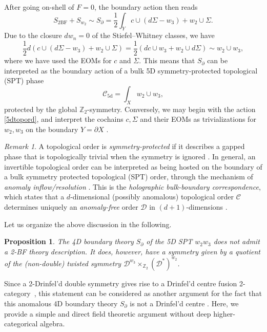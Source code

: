 \documentclass[onecolumn]{article}
\theoremstyle{theorem}
\newtheorem{proposition}{Proposition}[section]
\theoremstyle{remark}
\newtheorem{remark}{Remark}[section]
\theoremstyle{example}
\theoremstyle{definition}
\numberwithin{equation}{section}
\begin{document}
After going on-shell of $F=0$, the boundary action then reads \cite{Thorngren2015}
\begin{equation}
    S_\text{2BF}+S_{w_2} \sim S_\partial=\frac{1}{2}\int_Y c\cup (d\Sigma-w_3) + w_2\cup \Sigma.\label{bdytop}
\end{equation}
{Due} to the closure $dw_n=0$ of the Stiefel--Whitney classes, we have
\begin{equation}
    \frac{1}{2}d\left(c\cup (d\Sigma-w_3) + w_2\cup \Sigma\right)=\frac{1}{2}(dc \cup w_3 + w_2\cup d\Sigma) \sim w_2\cup w_3,\nonumber
\end{equation}
where we have used the EOMs for $c$ and $\Sigma$. This means that $S_\partial$ can be interpreted as the boundary action of a bulk 5D symmetry-protected topological (SPT) phase
\begin{equation}
    \mathcal{C}_\text{5d} = \int_X w_2\cup w_3, \label{5dtopord}
\end{equation}
protected by the global $\mathbb{Z}_2$-symmetry. Conversely, we may begin with the action \eqref{5dtopord}, and interpret the cochains $c,\Sigma$ and their EOMs as trivializations for $w_2,w_3$ on the boundary $Y=\partial X$ \cite{JuvenWang,Thorngren2015}.

\begin{remark}
A topological order is {\it symmetry-protected} if it describes a gapped phase that is topologically trivial when the symmetry is ignored \cite{XieChen:2013}. In general, an invertible topological order can be interpreted as being hosted on the boundary of a bulk symmetry protected topological (SPT) order, through the mechanism of {\it anomaly inflow/resolution} \cite{Witten:2019,JuvenWang}. This is the {\it holographic bulk-boundary correspondence}, which states that a $d$-dimensional (possibly anomalous) topological order $\mathcal{C}$ determines uniquely an {\it anomaly-free} order $\mathcal{D}$ in $(d+1)$-dimensions \cite{Kong:2020}.
\end{remark}


Let us organize the above discussion in the following.
\begin{proposition}
    The 4D boundary theory $S_\partial$ of the 5D SPT $w_2w_3$ does \textit{not} admit a 2-BF theory description. It does, however, have a symmetry given by a quotient of the (non-double) twisted symmetry $\mathcal{D}^{w_3}\times_{\mathbb{Z}_2}(\mathcal{D}^*)^{w_2}$.
\end{proposition}

{Since} %
 a 2-Drinfel'd double symmetry gives rise to a Drinfel'd centre fusion 2-category~\cite{Chen2z:2023}, this statement can be considered as another argument for the fact that this anomalous 4D boundary theory $S_\partial$ is not a Drinfel'd centre \cite{Johnson-Freyd:2020,Johnson_Freyd_2023}. Here, we provide a simple and direct field theoretic argument without deep higher-categorical algebra.
\end{document}
